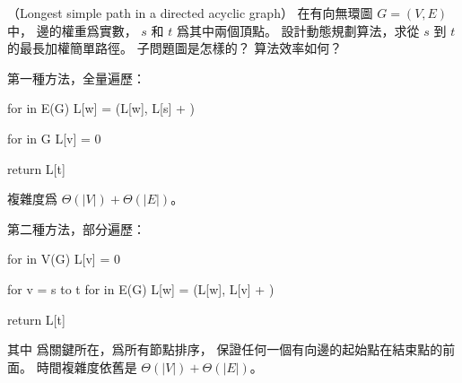 \startPROBLEM
（Longest simple path in a directed acyclic graph）
在有向無環圖 $G=(V,E)$ 中，
邊的權重爲實數， $s$ 和 $t$ 爲其中兩個頂點。
設計動態規劃算法，求從 $s$ 到 $t$ 的最長加權簡單路徑。
子問題圖是怎樣的？
算法效率如何？
\stopPROBLEM

\startANSWER
第一種方法，全量遍歷：

\startCLRSCODE
for  in E(G)
	L[w] = \max(L[w], L[s] + )
\stopCLRSCODE

\startCLRSCODE
for  in G
	L[v] = 0


return L[t]
\stopCLRSCODE

複雜度爲 $\Theta(|V|) + \Theta(|E|)$。

第二種方法，部分遍歷：

\startCLRSCODE
for  in V(G)
	L[v] = 0

for  v = s to t 
	for  in E(G)
		L[w] = \max(L[w], L[v] + )

return L[t]
\stopCLRSCODE

其中  爲關鍵所在，爲所有節點排序，
保證任何一個有向邊的起始點在結束點的前面。
時間複雜度依舊是 $\Theta(|V|) + \Theta(|E|)$。
\stopANSWER
